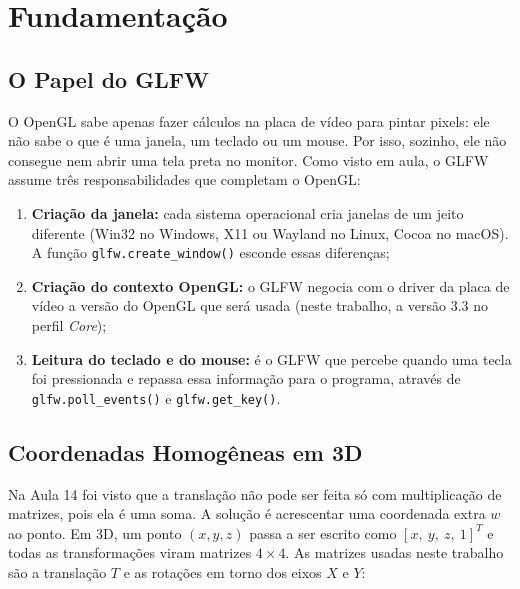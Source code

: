 \documentclass{article}
\begin{document}
\section{Fundamentação}

\subsection{O Papel do GLFW}

O OpenGL sabe apenas fazer cálculos na placa de vídeo para pintar pixels: ele não sabe o que é uma janela, um teclado ou um mouse. Por isso, sozinho, ele não consegue nem abrir uma tela preta no monitor. Como visto em aula, o GLFW assume três responsabilidades que completam o OpenGL:

\begin{enumerate}
    \item \textbf{Criação da janela:} cada sistema operacional cria janelas de um jeito diferente (Win32 no Windows, X11 ou Wayland no Linux, Cocoa no macOS). A função \texttt{glfw.create\_window()} esconde essas diferenças;
    \item \textbf{Criação do contexto OpenGL:} o GLFW negocia com o driver da placa de vídeo a versão do OpenGL que será usada (neste trabalho, a versão 3.3 no perfil \textit{Core});
    \item \textbf{Leitura do teclado e do mouse:} é o GLFW que percebe quando uma tecla foi pressionada e repassa essa informação para o programa, através de \texttt{glfw.poll\_events()} e \texttt{glfw.get\_key()}.
\end{enumerate}

\subsection{Coordenadas Homogêneas em 3D}

Na Aula 14 foi visto que a translação não pode ser feita só com multiplicação de matrizes, pois ela é uma soma. A solução é acrescentar uma coordenada extra $w$ ao ponto. Em 3D, um ponto $(x, y, z)$ passa a ser escrito como $[x,\ y,\ z,\ 1]^T$ e todas as transformações viram matrizes $4\times4$. As matrizes usadas neste trabalho são a translação $T$ e as rotações em torno dos eixos $X$ e $Y$:
\end{document}
